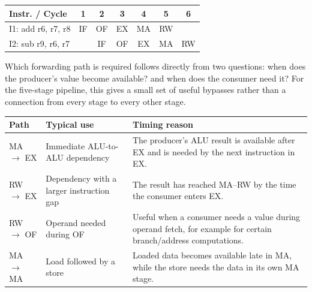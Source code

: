 \documentclass[11pt,a4paper]{report}
\begin{document}
\begin{center}
\begin{tabular}{lcccccc}
\toprule
Instr. / Cycle & 1 & 2 & 3 & 4 & 5 & 6 \\
\midrule
I1: add r6, r7, r8 & IF & OF & EX & MA & RW & \\
I2: sub r9, r6, r7 & & IF & OF & EX & MA & RW \\
\bottomrule
\end{tabular}
\end{center}

Which forwarding path is required follows directly from two questions: when does the producer's value become available? and when does the consumer need it? For the five-stage pipeline, this gives a small set of useful bypasses rather than a connection from every stage to every other stage.

\begin{center}
\end{center}

\begin{center}
\begin{tabular}{@{}L{2.6cm}L{4.6cm}L{6.4cm}@{}}
\toprule
Path & Typical use & Timing reason \\
\midrule
MA $\to$ EX & Immediate ALU-to-ALU dependency & The producer's ALU result is available after EX and is needed by the next instruction in EX. \\
RW $\to$ EX & Dependency with a larger instruction gap & The result has reached MA--RW by the time the consumer enters EX. \\
RW $\to$ OF & Operand needed during OF & Useful when a consumer needs a value during operand fetch, for example for certain branch/address computations. \\
MA $\to$ MA & Load followed by a store & Loaded data becomes available late in MA, while the store needs the data in its own MA stage. \\
\bottomrule
\end{tabular}
\end{center}
\end{document}
